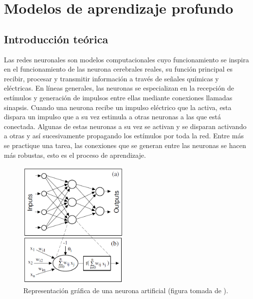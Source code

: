 \chapter{Modelos de aprendizaje profundo}
\label{ANNs}

\section{Introducción teórica}

Las redes neuronales son modelos computacionales cuyo funcionamiento se inspira en el funcionamiento de las 
neurona cerebrales reales, su función principal es recibir, procesar y transmitir información a través de señales
químicas y eléctricas. En líneas generales, las neuronas se especializan en la recepción de estímulos y generación
de impulsos entre ellas mediante conexiones llamadas sinapsis. Cuando una neurona recibe un impulso 
eléctrico que la activa, esta dispara un impulso que a su vez estimula a otras neuronas a las que está conectada. 
Algunas de estas neuronas a su vez se activan y se disparan activando a otras y así sucesivamente 
propagando los estímulos por toda la red. Entre más se practique una tarea, las conexiones que se generan entre las 
neuronas se hacen más robustas, esto es el proceso de aprendizaje. 

\begin{figure}[h!]
    \begin{center}
      \includegraphics[height=2.5in]{Figures/esquema_red.PNG}
      \caption{ Representación gráfica de una neurona artificial (figura tomada de \cite{gutierrez}). }
      \label{perceptron}
    \end{center}
  \end{figure}

